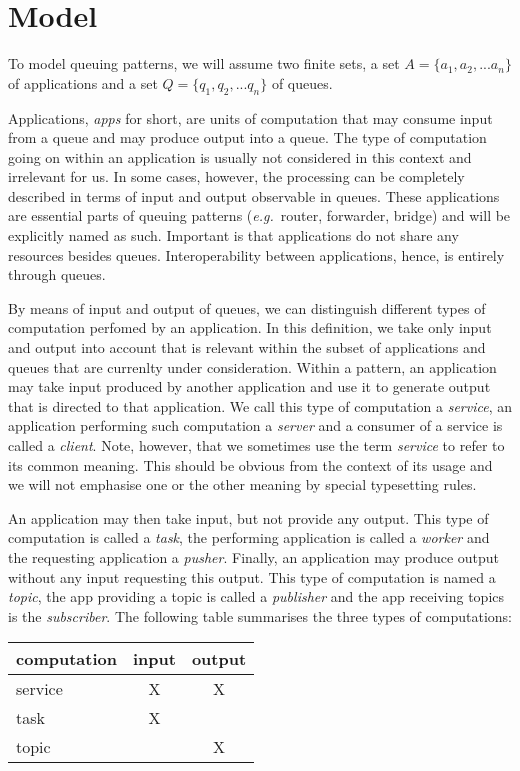 \documentclass[a4paper]{scrartcl}
\newcommand\eg{\textit{e.g.}}
\newcommand{\term}[1]{\emph{#1}}
\begin{document}
\section{Model}\label{sec:model}
To model queuing patterns, we will assume
two finite sets, a set $A = \{a_1,a_2,...a_n\}$
of applications and a set $Q = \{q_1,q_2,...q_n\}$
of queues.

Applications, \term{apps} for short, 
are units of computation that 
may consume input from a queue and
may produce output into a queue.
The type of computation going on within an application
is usually not considered in this context
and irrelevant for us. 
In some cases, however, the processing can be
completely described in terms of input and output
observable in queues.
These applications are essential parts of queuing patterns
(\eg\ router, forwarder, bridge)
and will be explicitly named as such.
Important is that applications
do not share any resources 
besides queues.
Interoperability between applications, hence,
is entirely through queues.

By means of input and output of queues,
we can distinguish different types of computation
perfomed by an application.
In this definition, we take only input and output
into account that is relevant within the subset
of applications and queues
that are currenlty under consideration.
Within a pattern, an application may take 
input produced by another application 
and use it to generate output that is directed to that application.
We call this type of computation a \term{service},
an application performing such computation a \term{server}
and a consumer of a service is called a \term{client}.
Note, however, that we sometimes use the term \term{service}
to refer to its common meaning.
This should be obvious from the context of its usage
and we will not emphasise one or the other meaning
by special typesetting rules.

An application may then take input,
but not provide any output.
This type of computation is called a \term{task},
the performing application is called a \term{worker}
and the requesting application a \term{pusher}.
Finally, an application may produce output 
without any input requesting this output.
This type of computation is named a \term{topic},
the app providing a topic is called a \term{publisher}
and the app receiving topics is the \term{subscriber}.
The following table summarises the three types of computations:

\begin{center}
\begin{tabular}{l|c|c}
\cline{1-3}
computation & input & output \\\hline\hline
service & X & X \\\hline
task & X & \\\hline
topic &  & X \\\hline
\end{tabular}
\end{center}
\end{document}
